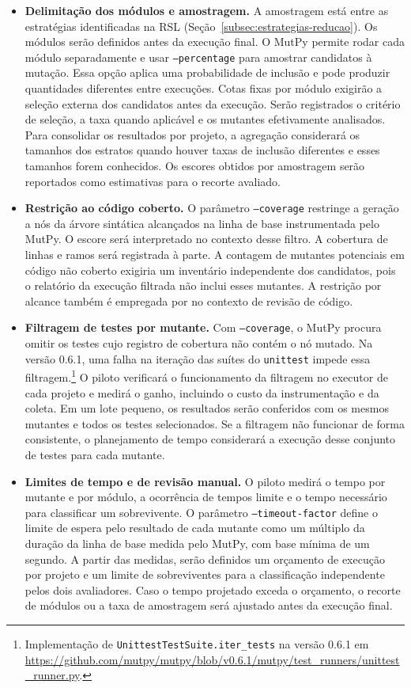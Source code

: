 \begin{itemize}
    \item \textbf{Delimitação dos módulos e amostragem.} A amostragem está entre as estratégias identificadas na RSL (Seção~\ref{subsec:estrategias-reducao}). Os módulos serão definidos antes da execução final. O MutPy permite rodar cada módulo separadamente e usar \texttt{--percentage} para amostrar candidatos à mutação. Essa opção aplica uma probabilidade de inclusão e pode produzir quantidades diferentes entre execuções. Cotas fixas por módulo exigirão a seleção externa dos candidatos antes da execução. Serão registrados o critério de seleção, a taxa quando aplicável e os mutantes efetivamente analisados. Para consolidar os resultados por projeto, a agregação considerará os tamanhos dos estratos quando houver taxas de inclusão diferentes e esses tamanhos forem conhecidos. Os escores obtidos por amostragem serão reportados como estimativas para o recorte avaliado.
    \item \textbf{Restrição ao código coberto.} O parâmetro \texttt{--coverage} restringe a geração a nós da árvore sintática alcançados na linha de base instrumentada pelo MutPy. O escore será interpretado no contexto desse filtro. A cobertura de linhas e ramos será registrada à parte. A contagem de mutantes potenciais em código não coberto exigiria um inventário independente dos candidatos, pois o relatório da execução filtrada não inclui esses mutantes. A restrição por alcance também é empregada por  no contexto de revisão de código.
    \item \textbf{Filtragem de testes por mutante.} Com \texttt{--coverage}, o MutPy procura omitir os testes cujo registro de cobertura não contém o nó mutado. Na versão 0.6.1, uma falha na iteração das suítes do \texttt{unittest} impede essa filtragem.\footnote{Implementação de \texttt{UnittestTestSuite.iter\_tests} na versão 0.6.1 em \url{https://github.com/mutpy/mutpy/blob/v0.6.1/mutpy/test_runners/unittest_runner.py}.} O piloto verificará o funcionamento da filtragem no executor de cada projeto e medirá o ganho, incluindo o custo da instrumentação e da coleta. Em um lote pequeno, os resultados serão conferidos com os mesmos mutantes e todos os testes selecionados. Se a filtragem não funcionar de forma consistente, o planejamento de tempo considerará a execução desse conjunto de testes para cada mutante.
    \item \textbf{Limites de tempo e de revisão manual.} O piloto medirá o tempo por mutante e por módulo, a ocorrência de tempos limite e o tempo necessário para classificar um sobrevivente. O parâmetro \texttt{--timeout-factor} define o limite de espera pelo resultado de cada mutante como um múltiplo da duração da linha de base medida pelo MutPy, com base mínima de um segundo. A partir das medidas, serão definidos um orçamento de execução por projeto e um limite de sobreviventes para a classificação independente pelos dois avaliadores. Caso o tempo projetado exceda o orçamento, o recorte de módulos ou a taxa de amostragem será ajustado antes da execução final.
\end{itemize}

